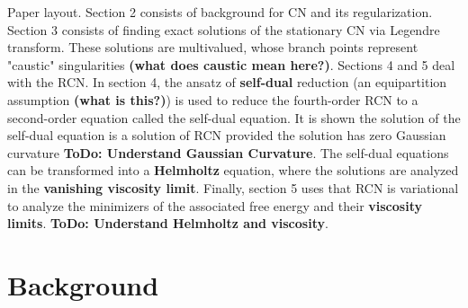 \documentclass[12pt]{article}
\newcounter{solution}
\begin{document}
\hspace*{10mm} Paper layout. Section 2 consists of background for CN and its regularization. Section 3 consists of finding exact solutions of the stationary CN via Legendre transform. These solutions are multivalued, whose branch points represent "caustic" singularities \textbf{(what does caustic mean here?)}. Sections 4 and 5 deal with the RCN. In section 4, the ansatz of \textbf{self-dual} reduction (an equipartition assumption \textbf{(what is this?)}) is used to reduce the fourth-order RCN to a second-order equation called the self-dual equation. It is shown the solution of the self-dual equation is a solution of RCN provided the solution has zero Gaussian curvature \textbf{ToDo: Understand Gaussian Curvature}. The self-dual equations can be transformed into a \textbf{Helmholtz} equation, where the solutions are analyzed in the \textbf{vanishing viscosity limit}. Finally, section 5 uses that RCN is variational to analyze the minimizers of the associated free energy and their \textbf{viscosity limits}. \textbf{ToDo: Understand Helmholtz and viscosity}.

\section{Background}
\end{document}

